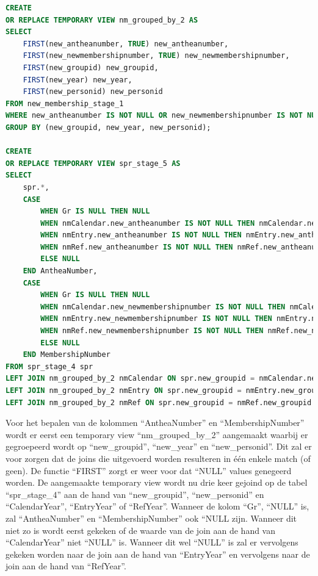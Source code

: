 \begin{lstlisting}[language=SQL, caption={Bepalen van de kolommen ``AntheaNumber'' en ``MembershipNumber'' op ``new\_syndicalpremiumrequest''.}, style=myStyle]
CREATE
OR REPLACE TEMPORARY VIEW nm_grouped_by_2 AS
SELECT 
    FIRST(new_antheanumber, TRUE) new_antheanumber,
    FIRST(new_newmembershipnumber, TRUE) new_newmembershipnumber,
    FIRST(new_groupid) new_groupid, 
    FIRST(new_year) new_year,
    FIRST(new_personid) new_personid
FROM new_membership_stage_1
WHERE new_antheanumber IS NOT NULL OR new_newmembershipnumber IS NOT NULL
GROUP BY (new_groupid, new_year, new_personid);

CREATE 
OR REPLACE TEMPORARY VIEW spr_stage_5 AS 
SELECT
    spr.*,
    CASE
        WHEN Gr IS NULL THEN NULL
        WHEN nmCalendar.new_antheanumber IS NOT NULL THEN nmCalendar.new_antheanumber
        WHEN nmEntry.new_antheanumber IS NOT NULL THEN nmEntry.new_antheanumber
        WHEN nmRef.new_antheanumber IS NOT NULL THEN nmRef.new_antheanumber
        ELSE NULL
    END AntheaNumber,
    CASE
        WHEN Gr IS NULL THEN NULL
        WHEN nmCalendar.new_newmembershipnumber IS NOT NULL THEN nmCalendar.new_newmembershipnumber
        WHEN nmEntry.new_newmembershipnumber IS NOT NULL THEN nmEntry.new_newmembershipnumber
        WHEN nmRef.new_newmembershipnumber IS NOT NULL THEN nmRef.new_newmembershipnumber
        ELSE NULL
    END MembershipNumber
FROM spr_stage_4 spr
LEFT JOIN nm_grouped_by_2 nmCalendar ON spr.new_groupid = nmCalendar.new_groupid AND spr.CalendarYear = nmCalendar.new_year AND spr.new_personid = nmCalendar.new_personid
LEFT JOIN nm_grouped_by_2 nmEntry ON spr.new_groupid = nmEntry.new_groupid AND spr.EntryYear = nmEntry.new_year AND spr.new_personid = nmEntry.new_personid  
LEFT JOIN nm_grouped_by_2 nmRef ON spr.new_groupid = nmRef.new_groupid AND spr.RefYear = nmRef.new_year AND spr.new_personid = nmRef.new_personid;
\end{lstlisting}

Voor het bepalen van de kolommen ``AntheaNumber'' en ``MembershipNumber'' wordt er eerst een temporary view ``nm\_grouped\_by\_2'' aangemaakt waarbij er gegroepeerd wordt op ``new\_groupid'', ``new\_year'' en ``new\_personid''. Dit zal er voor zorgen dat de joins die uitgevoerd worden resulteren in één enkele match (of geen). De functie ``FIRST'' zorgt er weer voor dat ``NULL'' values genegeerd worden. De aangemaakte temporary view wordt nu drie keer gejoind op de tabel ``spr\_stage\_4'' aan de hand van ``new\_groupid'', ``new\_personid'' en ``CalendarYear'', ``EntryYear'' of ``RefYear''. Wanneer de kolom ``Gr'', ``NULL'' is, zal ``AntheaNumber'' en ``MembershipNumber'' ook ``NULL zijn. Wanneer dit niet zo is wordt eerst gekeken of de waarde van de join aan de hand van ``CalendarYear'' niet ``NULL'' is. Wanneer dit wel ``NULL'' is zal er vervolgens gekeken worden naar de join aan de hand van ``EntryYear'' en vervolgens naar de join aan de hand van ``RefYear''.

